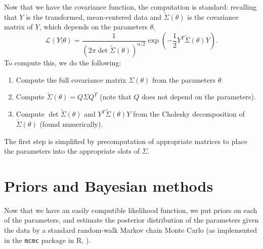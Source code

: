 \documentclass{article}
\begin{document}
Now that we have the covariance function, the computation is standard:
recalling that $Y$ is the transformed, mean-centered data and $\widetilde \Sigma(\theta)$ is the covariance matrix of $Y$,
which depends on the parameters $\theta$,
\begin{equation} \label{eqn:likelihood}
    \mathcal{L}(Y|\theta) = \frac{ 1 }{ \left( 2 \pi \det{\widetilde \Sigma(\theta)} \right)^{n/2} } \exp \left( - \frac{1}{2} Y^T {\widetilde \Sigma(\theta)} Y \right) .
\end{equation}
To compute this, we do the following:
\begin{enumerate}
    \item Compute the full covariance matrix $\Sigma(\theta)$ from the parameters $\theta$.
    \item Compute $\widetilde \Sigma(\theta) = Q \Sigma Q^T$ (note that $Q$ does not depend on the parameters).
    \item Compute $\det{\widetilde \Sigma(\theta)}$ and $Y^T {\widetilde \Sigma(\theta)} Y$ from the Cholesky decomposition of $\widetilde \Sigma(\theta)$ (found numerically).
\end{enumerate}
The first step is simplified by precomputation of appropriate matrices to place the parameters into the appropriate slots of $\Sigma$.


\section{Priors and Bayesian methods}

Now that we have an easily computible likelihood function,
we put priors on each of the parameters,
and estimate the posterior distribution of the parameters given the data
by a standard random-walk Markov chain Monte Carlo 
(as implemented in the \texttt{mcmc} package \citep{geyer2013mcmc} in R, \citet{R}).

\end{document}
